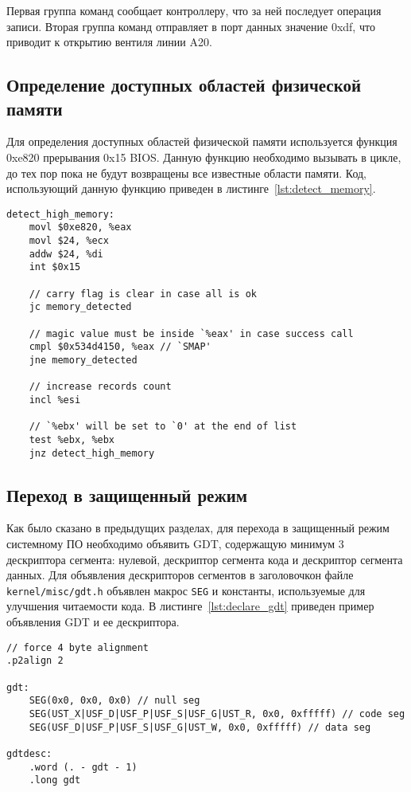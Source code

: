 Первая группа команд сообщает контроллеру, что за ней последует операция записи.
Вторая группа команд отправляет в порт данных значение 0xdf, что приводит к открытию
вентиля линии A20.

\subsection{Определение доступных областей физической памяти}
Для определения доступных областей физической памяти используется функция 0xe820 прерывания 0x15 BIOS.
Данную функцию необходимо вызывать в цикле, до тех пор пока не будут возвращены все известные области
памяти. Код, использующий данную функцию приведен в листинге~\ref{lst:detect_memory}.

\begin{lstlisting}[language={[x86masm]Assembler},
caption={Определение доступных областей физической памяти},label={lst:detect_memory}]
detect_high_memory:
	movl $0xe820, %eax
	movl $24, %ecx
	addw $24, %di
	int $0x15

	// carry flag is clear in case all is ok
	jc memory_detected

	// magic value must be inside `%eax' in case success call
	cmpl $0x534d4150, %eax // `SMAP'
	jne memory_detected

	// increase records count
	incl %esi

	// `%ebx' will be set to `0' at the end of list
	test %ebx, %ebx
	jnz detect_high_memory
\end{lstlisting}


\subsection{Переход в защищенный режим}
Как было сказано в предыдущих разделах, для перехода в защищенный режим системному ПО
необходимо объявить GDT, содержащую минимум 3 дескриптора сегмента: нулевой, дескриптор сегмента
кода и дескриптор сегмента данных. Для объявления дескрипторов сегментов в заголовочкон файле
\texttt{kernel/misc/gdt.h} объявлен макрос \texttt{SEG} и константы, используемые для улучшения
читаемости кода. В листинге~\ref{lst:declare_gdt} приведен пример объявления GDT и ее дескриптора.

\begin{lstlisting}[language={[x86masm]Assembler},
caption={Объявление GDT и ее дескриптора},label={lst:declare_gdt}]
// force 4 byte alignment
.p2align 2

gdt:
	SEG(0x0, 0x0, 0x0) // null seg
	SEG(UST_X|USF_D|USF_P|USF_S|USF_G|UST_R, 0x0, 0xfffff) // code seg
	SEG(USF_D|USF_P|USF_S|USF_G|UST_W, 0x0, 0xfffff) // data seg

gdtdesc:
	.word (. - gdt - 1)
	.long gdt
\end{lstlisting}

